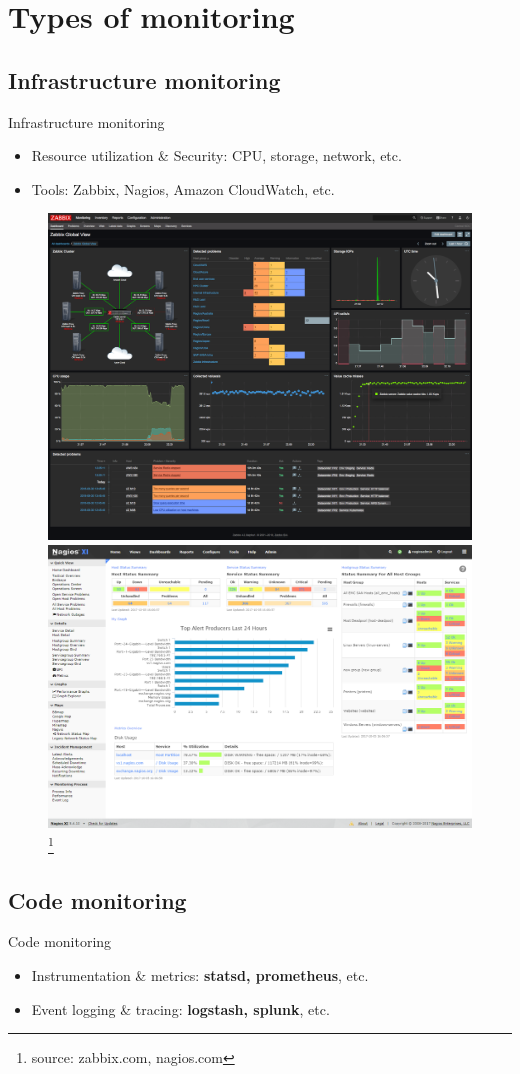 \documentclass{beamer}
\newcommand\blfootnote[1]{%
  \begingroup
  \renewcommand\thefootnote{}\footnote{\tiny  #1 }%
  \addtocounter{footnote}{-1}%
  \endgroup
}
\begin{document}
\section{Types of monitoring}

\subsection{Infrastructure monitoring}

\begin{frame}{Infrastructure monitoring}
  \begin{itemize}
  \item {Resource utilization \& Security: CPU, storage, network, etc.}
  \item {Tools: Zabbix, Nagios, Amazon CloudWatch, etc.}
  \end{itemize}
  	\begin{figure}%
	    \centering
	    \includegraphics[width=.45\linewidth]{zabbix_dashboard.png}
	    \qquad
	    \includegraphics[width=.45\linewidth]{nagios_dashboard.png}
	    \qquad
	    \blfootnote{source: zabbix.com, nagios.com}
	\end{figure}
\end{frame}

\subsection{Code monitoring}

\begin{frame}{Code monitoring}
	\begin{itemize}
		\item{Instrumentation \& metrics: \textbf{statsd, prometheus}, etc.}
  		\item{Event logging \& tracing: \textbf{logstash, splunk}, etc.}
  		
	\end{itemize}
\end{frame}
\end{document}
